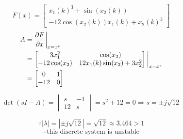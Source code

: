 \documentclass[12pt,a4paper]{article}
\begin{document}
	
	\[
	F(x) = \begin{bmatrix}
		x_1(k)^3 + \sin (x_2(k)) \\
		-12\cos(x_2(k))x_1(k) + x_2(k)^3
	\end{bmatrix}
	\]
	\begin{align*}
		A &= {\partial F \over \partial x}\bigg|_{x = x^e} \\
		&= \begin{bmatrix}
			3x_1^2 & \cos (x_2) \\
			-12\cos(x_2) & 12x_1(k)\sin(x_2) + 3x_2^2
		\end{bmatrix}\bigg|_{x = x^e} \\
		&= \begin{bmatrix}
			0 & 1 \\ -12 & 0
		\end{bmatrix}
	\end{align*}
	
	\[
	\det(sI - A) = \begin{vmatrix}
		s & -1  \\ 12 &s
	\end{vmatrix} = s^2 + 12 = 0 \Rightarrow s = \pm j\sqrt{12}
	\]
	
	\[
	\because \left|	\lambda \right| = |\pm j\sqrt{12}| = \sqrt{12} \approx 3.464 > 1
	\]
	\[
	\therefore \text{this discrete system is unstable}
	\]
	
\end{document}

